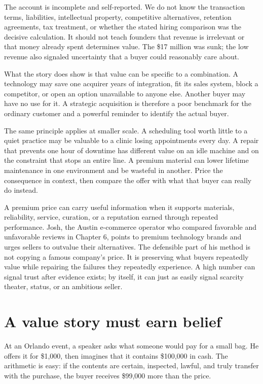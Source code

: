 The account is incomplete and self-reported. We do not know the transaction
terms, liabilities, intellectual property, competitive alternatives, retention
agreements, tax treatment, or whether the stated hiring comparison was the
decisive calculation. It should not teach founders that revenue is irrelevant
or that money already spent determines value. The \$17 million was sunk; the
low revenue also signaled uncertainty that a buyer could reasonably care about.

What the story does show is that value can be specific to a combination. A
technology may save one acquirer years of integration, fit its sales system,
block a competitor, or open an option unavailable to anyone else. Another
buyer may have no use for it. A strategic acquisition is therefore a poor
benchmark for the ordinary customer and a powerful reminder to identify the
actual buyer.

The same principle applies at smaller scale. A scheduling tool worth little to
a quiet practice may be valuable to a clinic losing appointments every day. A
repair that prevents one hour of downtime has different value on an idle
machine and on the constraint that stops an entire line. A premium material can
lower lifetime maintenance in one environment and be wasteful in another.
Price the consequence in context, then compare the offer with what that buyer
can really do instead.

A premium price can carry useful information when it supports materials,
reliability, service, curation, or a reputation earned through repeated
performance. Josh, the Austin e-commerce operator who compared favorable and
unfavorable reviews in Chapter 6, points to premium technology brands and urges
sellers to outvalue their alternatives. The defensible part of his method is
not copying a famous company's price. It is preserving what buyers repeatedly
value while repairing the failures they repeatedly experience. A high number
can signal trust after evidence exists; by itself, it can just as easily signal
scarcity theater, status, or an ambitious seller.

\section{A value story must earn belief}

At an Orlando event, a speaker asks what someone would pay for a small bag. He
offers it for \$1,000, then imagines that it contains \$100,000 in cash. The
arithmetic is easy: if the contents are certain, inspected, lawful, and truly
transfer with the purchase, the buyer receives \$99,000 more than the price.

